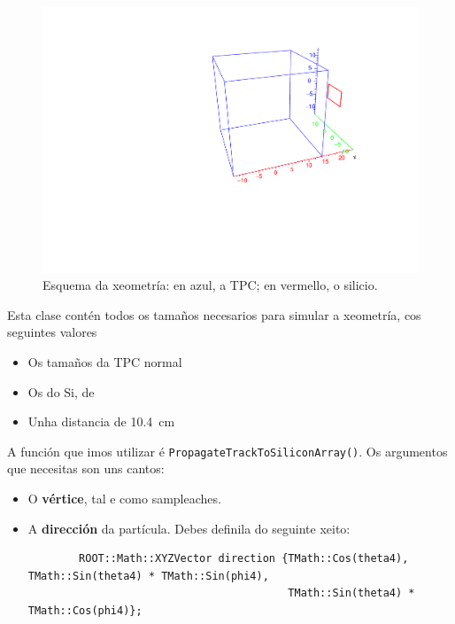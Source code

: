 \documentclass[11pt, a4paper]{article}
\begin{document}
\begin{enumerate}
          \begin{figure}[!htb]
              \centering
              \includegraphics[width=0.5\linewidth]{figures/geo.pdf}
              \caption{Esquema da xeometría: en azul, a TPC; en vermello, o silicio.}
              \label{fig:geo}
          \end{figure}

          Esta clase contén todos os tamaños necesarios para simular a xeometría, cos seguintes valores
          \begin{itemize}
              \item Os tamaños da TPC normal
              \item Os do Si, de 
              \item Unha distancia de \qty{10.4}{\cm}
          \end{itemize}

          A función que imos utilizar é \lstinline|PropagateTrackToSiliconArray()|. Os argumentos que necesitas son uns cantos:
          \begin{itemize}
              \item O \textbf{vértice}, tal e como sampleaches.
              \item A \textbf{dirección} da partícula. Debes definila do seguinte xeito:
                    \begin{lstlisting}
        ROOT::Math::XYZVector direction {TMath::Cos(theta4), TMath::Sin(theta4) * TMath::Sin(phi4),
                                         TMath::Sin(theta4) * TMath::Cos(phi4)};


\end{lstlisting}
\end{itemize}
\end{enumerate}
\end{document}
